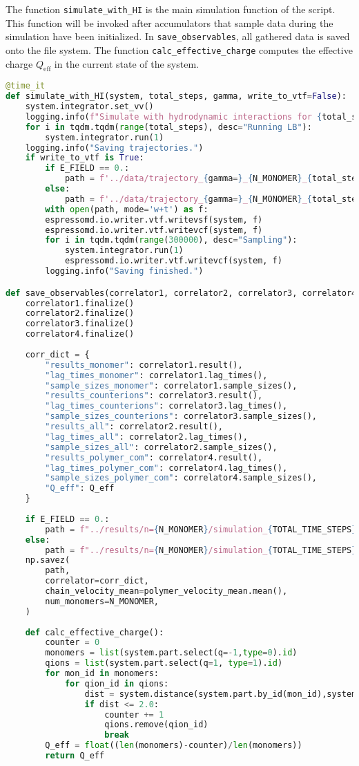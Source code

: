The function \texttt{simulate\_with\_HI} is the main simulation function of the script. This function will be invoked after accumulators that sample data during the simulation have been initialized. In \texttt{save\_observables}, all gathered data is saved onto the file system. The function \texttt{calc\_effective\_charge} computes the effective charge $Q_\text{eff}$ in the current state of the system.
\begin{lstlisting}[language=python]
@time_it
def simulate_with_HI(system, total_steps, gamma, write_to_vtf=False):
	system.integrator.set_vv()
	logging.info(f"Simulate with hydrodynamic interactions for {total_steps} steps.")
	for i in tqdm.tqdm(range(total_steps), desc="Running LB"):
		system.integrator.run(1)
	logging.info("Saving trajectories.")
	if write_to_vtf is True:
		if E_FIELD == 0.:
			path = f'../data/trajectory_{gamma=}_{N_MONOMER}_{total_steps=}.vtf'
		else:
			path = f'../data/trajectory_{gamma=}_{N_MONOMER}_{total_steps=}_E.vtf'
		with open(path, mode='w+t') as f:
		espressomd.io.writer.vtf.writevsf(system, f)
		espressomd.io.writer.vtf.writevcf(system, f)    
		for i in tqdm.tqdm(range(300000), desc="Sampling"):
			system.integrator.run(1)
			espressomd.io.writer.vtf.writevcf(system, f)
		logging.info("Saving finished.")

def save_observables(correlator1, correlator2, correlator3, correlator4, polymer_velocity_mean, Q_eff):
	correlator1.finalize()
	correlator2.finalize()
	correlator3.finalize()
	correlator4.finalize()
	
	corr_dict = {
		"results_monomer": correlator1.result(),
		"lag_times_monomer": correlator1.lag_times(),
		"sample_sizes_monomer": correlator1.sample_sizes(),
		"results_counterions": correlator3.result(),
		"lag_times_counterions": correlator3.lag_times(),
		"sample_sizes_counterions": correlator3.sample_sizes(),
		"results_all": correlator2.result(),
		"lag_times_all": correlator2.lag_times(),
		"sample_sizes_all": correlator2.sample_sizes(),
		"results_polymer_com": correlator4.result(),
		"lag_times_polymer_com": correlator4.lag_times(),
		"sample_sizes_polymer_com": correlator4.sample_sizes(),
		"Q_eff": Q_eff
	}
	
	if E_FIELD == 0.:
		path = f"../results/n={N_MONOMER}/simulation_{TOTAL_TIME_STEPS}_{P3M_EQ_STEPS}_{GAMMA}.npz"
	else:
		path = f"../results/n={N_MONOMER}/simulation_{TOTAL_TIME_STEPS}_{P3M_EQ_STEPS}_{GAMMA}_E.npz"
	np.savez(
		path,
		correlator=corr_dict,
		chain_velocity_mean=polymer_velocity_mean.mean(),
		num_monomers=N_MONOMER,
	)
	
	def calc_effective_charge():
		counter = 0
		monomers = list(system.part.select(q=-1,type=0).id)
		qions = list(system.part.select(q=1, type=1).id)
		for mon_id in monomers:
			for qion_id in qions:
				dist = system.distance(system.part.by_id(mon_id),system.part.by_id(qion_id))
				if dist <= 2.0:
					counter += 1
					qions.remove(qion_id)
					break
		Q_eff = float((len(monomers)-counter)/len(monomers))
		return Q_eff
\end{lstlisting}
